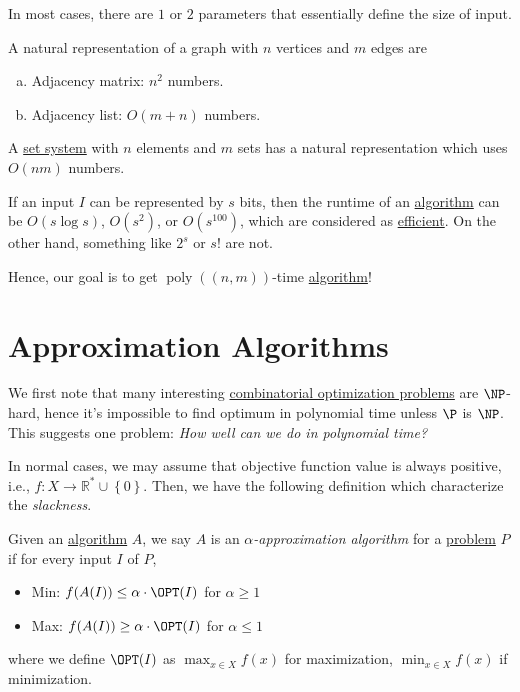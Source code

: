 \begin{note}
	In most cases, there are \(1\) or \(2\) parameters that essentially define the size of input.

	\begin{eg}[Graph]
		A natural representation of a graph with \(n\) vertices and \(m\) edges are
		\begin{enumerate}[(a)]
			\item Adjacency matrix: \(n ^{2} \) numbers.
			\item Adjacency list: \(O(m+n)\) numbers.
		\end{enumerate}
	\end{eg}

	\begin{eg}
		A \hyperref[def:set-system]{set system} with \(n\) elements and \(m\) sets has a natural representation which uses \(O(nm)\) numbers.
	\end{eg}
\end{note}

\begin{eg}
	If an input \(I\) can be represented by \(s\) bits, then the runtime of an \hyperref[def:algorithm]{algorithm} can be \(O(s \log s)\), \(O(s ^{2} )\), or \(O(s^{100} )\), which are considered as \hyperref[def:efficient]{efficient}. On the other hand, something like \(2^s\) or \(s!\) are not.
\end{eg}

Hence, our goal is to get \(\mathop{\mathrm{poly}}((n, m))\)-time \hyperref[def:algorithm]{algorithm}!

\section{Approximation Algorithms}

We first note that many interesting \hyperref[def:combinatorial-optimization]{combinatorial optimization problems} are \(\NP\)-hard, hence it's impossible to find optimum in polynomial time unless \(\P\) is \(\NP\). This suggests one problem: \emph{How well can we do in polynomial time?}

In normal cases, we may assume that objective function value is always positive, i.e., \(f\colon X \to \mathbb{R} ^* \cup \left\{ 0 \right\} \). Then, we have the following definition which characterize the \emph{slackness}.

\begin{definition}\label{def:approximation-algorithm}
	Given an \hyperref[def:algorithm]{algorithm} \(A\), we say \(A\) is an \emph{\(\alpha\)-approximation algorithm} for a \hyperref[def:computational-problem]{problem} \(P\) if for every input \(I\) of \(P\),
	\begin{itemize}
		\item Min: \(f(A(I)) \leq \alpha \cdot \OPT (I)\) for \(\alpha \geq 1\)
		\item Max: \(f(A(I)) \geq \alpha \cdot \OPT (I)\) for \(\alpha \leq 1\)
	\end{itemize}
	where we define \(\OPT(I)\) as \(\max _{x\in X}f(x)\) for maximization, \(\min _{x\in X}f(x)\) if minimization.
\end{definition}

